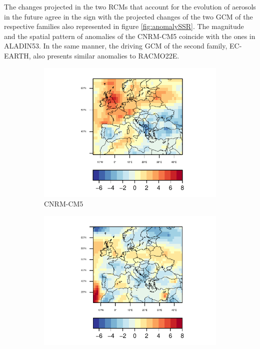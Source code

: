 The changes projected in the two RCMs that account for the evolution of aerosols in the future agree in the sign with the projected changes of the two GCM of the respective families also represented in figure \ref{fig:anomalySSR}. The magnitude and the spatial pattern of anomalies of the CNRM-CM5 coincide with the ones in ALADIN53. In the same manner, the driving GCM of the second family, EC-EARTH, also presents similar anomalies to RACMO22E. 

\begin{figure}[h]
  \centering\begin{subfigure}{0.4\textwidth}
    \includegraphics[width=1.4\textwidth]{figs/capitulo7/CNRM-CM5_ANOMALIAS_JJA_CLT_2050-2021.pdf}
    \caption{CNRM-CM5}
  \end{subfigure}
  \centering\begin{subfigure}{0.4\textwidth}
    \includegraphics[width=1.4\textwidth]{figs/capitulo7/EC-EARTH_ANOMALIAS_JJA_CLT_2050-2021.pdf}\hfill

\end{subfigure}
\end{figure}

